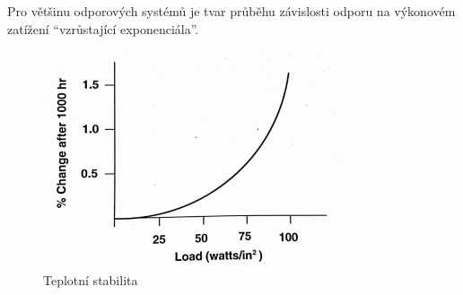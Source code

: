Pro většinu odporových systémů je tvar průběhu závislosti odporu na výkonovém zatížení “vzrůstající exponenciála”.

\begin{figure}[h]
   \begin{center}
     \includegraphics[scale=1]{images/Stab.png}
   \end{center}
   \caption{Teplotní stabilita}
\end{figure}


































